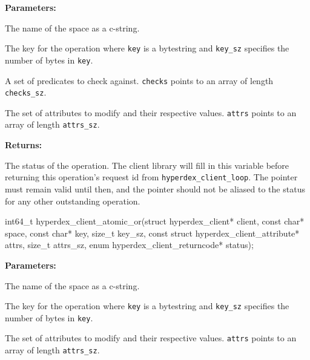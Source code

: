 \noindent\textbf{Parameters:}
\begin{description}[labelindent=\widthof{{\texttt{checks}, \texttt{checks\_sz}}},leftmargin=*,noitemsep,nolistsep,align=right]
\item[\texttt{space}] The name of the space as a c-string.
\item[\texttt{key}, \texttt{key\_sz}] The key for the operation where \texttt{key} is a bytestring and \texttt{key\_sz} specifies the number of bytes in \texttt{key}.
\item[\texttt{checks}, \texttt{checks\_sz}] A set of predicates to check against.  \texttt{checks} points to an array of length \texttt{checks\_sz}.
\item[\texttt{attrs}, \texttt{attrs\_sz}] The set of attributes to modify and their respective values.  \texttt{attrs} points to an array of length \texttt{attrs\_sz}.
\end{description}

\noindent\textbf{Returns:}
\begin{description}[labelindent=\widthof{{\texttt{status}}},leftmargin=*,noitemsep,nolistsep,align=right]
\item[\texttt{status}] The status of the operation.  The client library will fill in this variable before returning this operation's request id from \texttt{hyperdex\_client\_loop}.  The pointer must remain valid until then, and the pointer should not be aliased to the status for any other outstanding operation.
\end{description}

\funcsep
\begin{ccode}
int64_t hyperdex_client_atomic_or(struct hyperdex_client* client,
                const char* space,
                const char* key, size_t key_sz,
                const struct hyperdex_client_attribute* attrs, size_t attrs_sz,
                enum hyperdex_client_returncode* status);
\end{ccode}
\funcdesc 

\noindent\textbf{Parameters:}
\begin{description}[labelindent=\widthof{{\texttt{attrs}, \texttt{attrs\_sz}}},leftmargin=*,noitemsep,nolistsep,align=right]
\item[\texttt{space}] The name of the space as a c-string.
\item[\texttt{key}, \texttt{key\_sz}] The key for the operation where \texttt{key} is a bytestring and \texttt{key\_sz} specifies the number of bytes in \texttt{key}.
\item[\texttt{attrs}, \texttt{attrs\_sz}] The set of attributes to modify and their respective values.  \texttt{attrs} points to an array of length \texttt{attrs\_sz}.
\end{description}

